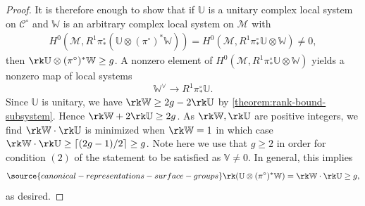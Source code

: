 \begin{proof}
	It is therefore enough to show that if $\mathbb{U}$ is a unitary complex local system on
	$\mathscr C^\circ$ and $\mathbb{W}$ is an arbitrary complex local system on $\mathscr M$
	with
\begin{align*}
	H^0(\mathscr{M}, R^1\pi^\circ_* (\mathbb{U}\otimes (\pi^\circ)^*\mathbb{W}))=
	H^0(\mathscr M, R^1 \pi^\circ_* \mathbb U \otimes \mathbb W) \neq 0,
\end{align*}
	then $\rk \mathbb U \otimes (\pi^\circ)^*\mathbb W \geq g$.
A nonzero element of $H^0(\mathscr M, R^1 \pi^\circ_* \mathbb U \otimes \mathbb W)$ yields a nonzero map of local systems $$\mathbb{W}^\vee\to R^1\pi^\circ_*\mathbb{U}.$$
Since $\mathbb U$ is unitary, we have
$\rk \mathbb{W} \geq 2g - 2\rk \mathbb U$
by \autoref{theorem:rank-bound-subsystem}.
Hence $\rk \mathbb{W} + 2\rk \mathbb{U} \geq 2g$.
As $\rk \mathbb{W}, \rk\mathbb{U}$ are positive integers, we find
$\rk \mathbb W \cdot \rk \mathbb U$ is minimized when $\rk \mathbb W = 1$
in which case $\rk \mathbb W \cdot \rk \mathbb U \geq \lceil (2g-1)/2 \rceil \geq g$.
Note here we use that $g \geq 2$ in order for condition $(2)$ of the statement to be
satisfied as $\mathbb V \neq 0$.
In general, this implies
\begin{align}
	\label{equation:rank-product-bound}
\source{canonical-representations-surface-groups}
\rk (\mathbb{U}\otimes (\pi^\circ)^*\mathbb{W})=\rk \mathbb W \cdot \rk \mathbb U \geq g,
\end{align}
as desired.
\end{proof}
